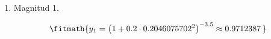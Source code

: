 \begin{enumerate}

\item Magnitud 1.

\[\fitmath{y_{1}={\left(1+0.2\cdot {0.2046075702}^{2}\right)}^{-3.5}\approx 0.9712387\,}\]

\end{enumerate}
